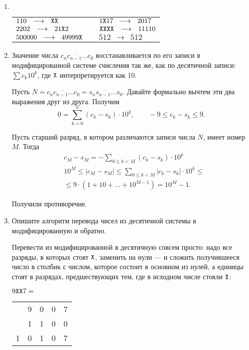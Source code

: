 
\begin{enumerate}

\item $\phantom{x}$

\def\ra{\ \ \longrightarrow\ \ }
\def\X{\text{\ttfamily X}}
\begin{center}\begin{tabular}{lll}
	$110 \ra \X\X$ & \quad & $1\X17 \ra 2017$ \\
	$2202 \ra 21\X2$ & & $\X\X\X\X \ra 11110$ \\
	$500000 \ra 49999\X$ & & $512 \ra 512$
\end{tabular}\end{center}

\item Значение числа $\overline{c_nc_{n-1}\ldots c_0}$ восстанавливается по его записи в модифицированной системе счисления так же, как по десятичной записи: $\sum c_k10^k$, где $\X$ интерпретируется как 10.

Пусть $N = \overline{c_nc_{n-1}\ldots c_0} = \overline{s_ns_{n-1}\ldots s_0}$. Давайте формально вычтем эти два выражения друг из друга. Получим
$$0 = \sum\limits_{k=0}^n (c_k-s_k) \cdot 10^k, \qquad -9 \le c_k-s_k \le 9.$$

Пусть старший разряд, в котором различаются записи числа $N$, имеет номер $M$. Тогда
\begin{align*}
	& c_M-s_M = - \sum\limits_{0 \le k < M} (c_k-s_k) \cdot 10^k \\
	& 10^M \le \left| c_M-s_M \right| \le
		\sum\limits_{0 \le k < M} \left| c_k-s_k \right| \cdot 10^k \le \\
	& \le 9 \cdot (1 + 10 + \ldots + 10^{M-1}) = 10^M-1.
\end{align*}

Получили противоречие.

\item Опишите алгоритм перевода чисел из десятичной системы в модифицированную и обратно.

Перевести из модифицированной в десятичную совсем просто: надо все разряды, в которых стоят $\X$, заменить на нули — и сложить получившееся число в столбик с числом, которое состоит в основном из нулей, а единицы стоят в разрядах, предшествующих тем, где в исходном числе стояли $\X$:

\begin{center}
$9\X\X7 =$ \begin{tabular}{ccccc}
	   & 9 & 0 & 0 & 7 \\
	   & 1 & 1 & 0 & 0 \\ \hline
	1 & 0 & 1 & 0 & 7 \\
\end{tabular} \end{center}


\end{enumerate}
